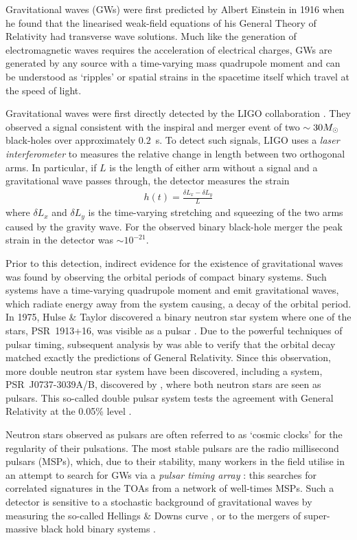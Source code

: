 Gravitational waves (GWs) were first predicted by Albert Einstein in 1916
\citep{einstein1916approximative} when he found that the linearised weak-field
equations of his General Theory of Relativity had transverse wave solutions.
Much like the generation of electromagnetic waves requires the acceleration of
electrical charges, GWs are generated by any source with a
time-varying mass quadrupole moment and can be understood as `ripples' or
spatial strains in the spacetime itself which travel at the speed of light.

Gravitational waves were first directly detected by the LIGO collaboration
\citep{abbott2016observation}. They observed a signal consistent with the
inspiral and merger event of two $\sim 30 M_{\odot}$ black-holes over approximately
$0.2$~s. To detect such signals, LIGO uses a \emph{laser interferometer} to
measures the relative change in length between two orthogonal arms. In
particular, if $L$ is the length of either arm without a signal and a
gravitational wave passes through, the detector measures the strain
\begin{align}
h(t) = \frac{\delta L_x - \delta L_y}{L}
\end{align}
where $\delta L_x$ and $\delta L_y$ is the time-varying stretching and
squeezing of the two arms caused by the gravity wave. For the observed binary
black-hole merger the peak strain in the detector was $\sim 10^{-21}$.

Prior to this detection, indirect evidence for the existence of gravitational
waves was found by observing the orbital periods of compact binary systems.
Such systems have a time-varying quadrupole moment and emit gravitational
waves, which radiate energy away from the system causing, a decay of the orbital
period. In 1975, Hulse \& Taylor discovered a binary neutron star system where
one of the stars, PSR~1913+16, was visible as a pulsar \citep{Hulse1975}. Due to
the powerful techniques of pulsar timing, subsequent analysis by
\citet{Taylor1982} was able to verify that the orbital decay matched exactly
the predictions of General Relativity. Since this observation, more double
neutron star system have been discovered, including a system, PSR~J0737-3039A/B,
discovered by \citet{burgay2003increased}, where both neutron stars are seen as
pulsars. This so-called double pulsar system tests the agreement with General
Relativity at the 0.05\% level \citep{kramerstairs2006}.

Neutron stars observed as pulsars are often referred to as `cosmic clocks' for
the regularity of their pulsations. The most stable pulsars are the radio
millisecond pulsars (MSPs), which, due to their stability, many workers in the field
utilise in an attempt to search for GWs via a \emph{pulsar timing array}
\citep{hobbs2010international}: this searches for correlated signatures in the
TOAs from a network of well-times MSPs. Such a detector is sensitive to a
stochastic background of gravitational waves by measuring the so-called
Hellings \& Downs curve \citep{hellings1983upper}, or to the mergers of
super-massive black hold binary systems \citep{lee2011gravitational}.

